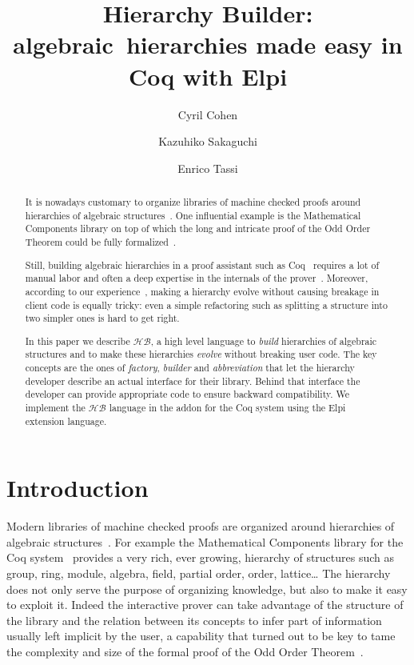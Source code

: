 \documentclass[a4paper,UKenglish,cleveref, autoref]{lipics-v2019}
\title{Hierarchy Builder: algebraic~hierarchies made easy in Coq with Elpi} %
\author{Cyril Cohen}{Inria, Universit\'e C\^ote d'Azur, France}{Cyril.Cohen@inria.fr}{}{}
\author{Kazuhiko Sakaguchi}{University of Tsukuba, Japan}{sakaguchi@logic.cs.tsukuba.ac.jp}{}{}
\author{Enrico Tassi}{Inria, Universit\'e C\^ote d'Azur, France}{Enrico.Tassi@inria.fr}{}{}
\newcommand{\HB}{\ensuremath{\mathcal{HB}}}
\newcommand{\hb}{\coq{hierarchy-builder}}
\newcommand{\factory}{factory}
\newcommand{\phantterm}{abbreviation}
\newcommand{\mixinbuilder}{builder}
\theoremstyle{implem}
\theoremstyle{implem}
\theoremstyle{command}
\begin{document}
\maketitle

\begin{abstract}
It is nowadays customary to organize libraries of machine checked
proofs around hierarchies of algebraic
structures~\cite{DBLP:conf/mpc/AffeldtNS19,DBLP:journals/mics/BoldoLM15,Cohen_phd,Holzl:2013,10.1145/3372885.3373824,Rouhling_phd,mathclasses}.
One influential example is the Mathematical Components library on top
of which the long and intricate proof of the Odd Order
Theorem could be fully formalized~\cite{DBLP:conf/itp/GonthierAABCGRMOBPRSTT13}.

Still, building algebraic hierarchies in a proof assistant such as Coq~\cite{Coq:manual}
requires a lot of manual labor and often a deep expertise in the internals of
the prover~\cite{DBLP:conf/tphol/GarillotGMR09,DBLP:conf/itp/MahboubiT13}.
Moreover, according to our experience~\cite{KSdraft},
making a hierarchy evolve without causing breakage in client code is equally tricky:
even a simple refactoring such as splitting a structure into two simpler ones
is hard to get right.

In this paper we describe \HB{}, a high level language
to \emph{build} hierarchies of algebraic structures and to make these hierarchies
\emph{evolve} without breaking user code. The key concepts are the ones of
\emph{\factory{}}, \emph{\mixinbuilder{}} and \emph{\phantterm{}} that let the hierarchy developer
describe an actual
interface for their library. Behind that interface the developer can provide
appropriate code to ensure backward compatibility.
We implement the \HB{} language in the \hb{} addon for the Coq
system using the Elpi~\cite{DBLP:conf/lpar/DunchevGCT15,CoqElpi}
extension language.
\end{abstract}

\section{Introduction}

Modern libraries of machine checked proofs are organized around
hierarchies of algebraic structures~\cite{DBLP:conf/mpc/AffeldtNS19,DBLP:journals/mics/BoldoLM15,Cohen_phd,Holzl:2013,10.1145/3372885.3373824,Rouhling_phd,mathclasses}.
For example the Mathematical Components library for the Coq system~\cite{Coq:manual}
provides a very rich, ever growing, hierarchy of structures such as
group, ring, module, algebra, field, partial order, order, lattice\ldots
The hierarchy does not only serve the purpose of organizing knowledge, but
also to make it easy to exploit it. Indeed the interactive prover can
take advantage of the structure of the library and the relation between
its concepts to infer part of information usually left implicit
by the user, a capability that turned out to be key to tame
the complexity and size of the formal proof of the Odd Order
Theorem~\cite{DBLP:conf/itp/GonthierAABCGRMOBPRSTT13}.
\end{document}

